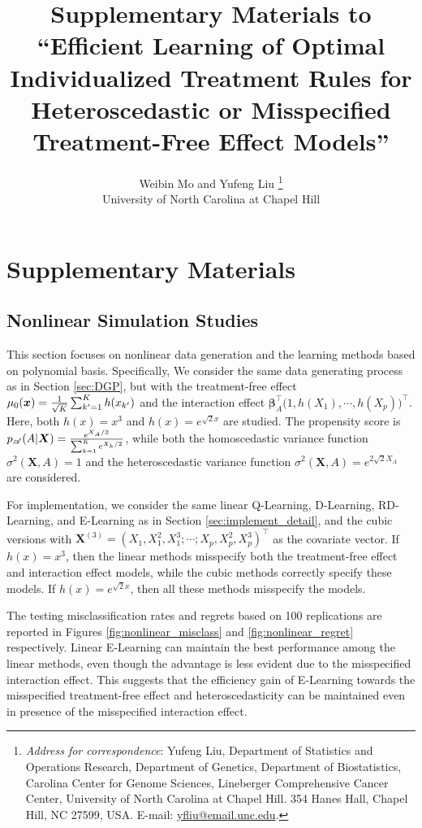 \documentclass[11pt]{article}
\title{Supplementary Materials to ``Efficient Learning of Optimal Individualized Treatment Rules for Heteroscedastic or Misspecified Treatment-Free Effect Models''}
\author{
	Weibin Mo and Yufeng Liu%
	\thanks{
		\textit{Address for correspondence}: Yufeng Liu, Department of Statistics and Operations Research, Department of Genetics, Department of Biostatistics, Carolina Center for Genome Sciences, Lineberger Comprehensive Cancer Center,  University of North Carolina at Chapel Hill. 354 Hanes Hall, Chapel Hill, NC 27599, USA. E-mail: \href{mailto:yfliu@email.unc.edu}{yfliu@email.unc.edu}.
	} 
	\\ 
	University of North Carolina at Chapel Hill
}
\date{}
\numberwithin{equation}{section}
\theoremstyle{definition}
\theoremstyle{remark}
\newcommand{\bx}{\bm{x}}
\newcommand{\bX}{\bm{X}}
\newcommand{\bbeta}{\bm{\beta}}
\newcommand{\sA}{\mathscr{A}}
\begin{document}
\maketitle
\tableofcontents
\listoftables
\listoffigures


\newpage 

\renewcommand{\thesection}{S}
\section{Supplementary Materials}

\subsection{Nonlinear Simulation Studies}\label{sec:simulation_nonlinear}
This section focuses on nonlinear data generation and the learning methods based on polynomial basis. Specifically,
We consider the same data generating process as in Section \ref{sec:DGP}, but with the treatment-free effect $ \mu_{0}(\bx) = {1 \over \sqrt{K}}\sum_{k'=1}^{K}h(x_{k'}) $ and the interaction effect $ \bbeta_{A}^{\intercal}\big(1,h(X_{1}),\cdots,h(X_{p})\big)^{\intercal} $. Here, both $ h(x) = x^{3} $ and $ h(x) = e^{\sqrt{2}x} $ are studied. The propensity score is $ p_{\sA}(A|\bX) = {e^{X_{A}/2} \over \sum_{k=1}^{K}e^{X_{k}/2}} $, while both the homoscedastic variance function $ \sigma^{2}(\bX,A) = 1 $ and the heteroscedastic variance function $ \sigma^{2}(\bX,A) = e^{2\sqrt{2} X_{A}} $ are considered.

For implementation, we consider the same linear Q-Learning, D-Learning, RD-Learning, and E-Learning as in Section \ref{sec:implement_detail}, and the cubic versions with $ \bX^{(3)} = (X_{1},X_{1}^{2},X_{1}^{3};\cdots;X_{p},X_{p}^{2},X_{p}^{3})^{\intercal} $ as the covariate vector. If $ h(x) = x^{3} $, then the linear methods misspecify both the treatment-free effect and interaction effect models, while the cubic methods correctly specify these models. If $ h(x) = e^{\sqrt{2}x} $, then all these methods misspecify the models.

The testing misclassification rates and regrets based on 100 replications are reported in Figures \ref{fig:nonlinear_misclass} and \ref{fig:nonlinear_regret} respectively. 
Linear 	E-Learning can maintain the best performance among the linear methods, even though the advantage is less evident due to the misspecified interaction effect. This suggests that the efficiency gain of E-Learning towards the misspecified treatment-free effect and heteroscedasticity can be maintained even in presence of the misspecified interaction effect.
\end{document}
